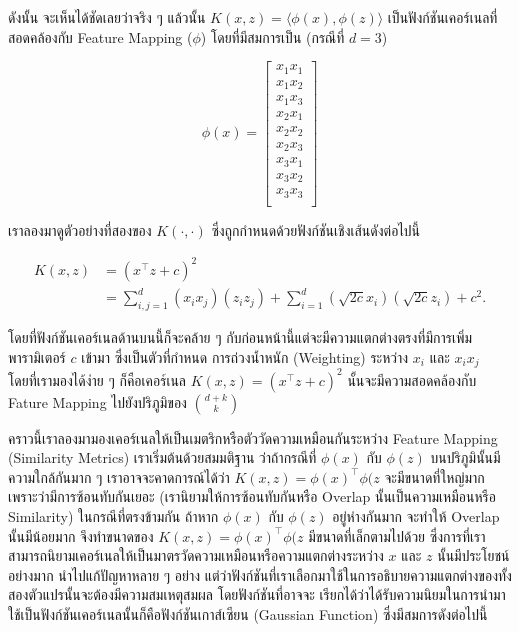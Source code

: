 \noindent ดังนั้น จะเห็นได้ชัดเลยว่าจริง ๆ แล้วนั้น $K(x,z) = \langle\phi(x),\phi(z)\rangle$ เป็นฟังก์ชันเคอร์เนลที่สอดคล้องกับ
Feature Mapping ($\phi$) โดยที่มีสมการเป็น (กรณีที่ $d = 3$)

\begin{equation}
    \phi(x) = \begin{bmatrix}
    x_1 x_1\\
    x_1 x_2\\
    x_1 x_3\\
    x_2 x_1\\
    x_2 x_2\\
    x_2 x_3\\
    x_3 x_1\\
    x_3 x_2\\
    x_3 x_3\\
    \end{bmatrix}
\end{equation}

เราลองมาดูตัวอย่างที่สองของ $K(\cdot,\cdot)$ ซึ่งถูกกำหนดด้วยฟังก์ชันเชิงเส้นดังต่อไปนี้

\begin{align}
    K(x,z) &= (x^{\top} z + c)^2\\
    &= \sum_{i,j=1}^d (x_i x_j)(z_i z_j) + \sum_{i=1}^d \left(\sqrt{2c}x_i\right) \left(\sqrt{2c}z_i\right) + c^2.
\end{align}

\noindent โดยที่ฟังก์ชันเคอร์เนลด้านบนนี้ก็จะคล้าย ๆ กับก่อนหน้านี้แต่จะมีความแตกต่างตรงที่มีการเพิ่มพารามิเตอร์ $c$ เข้ามา ซึ่งเป็นตัวที่กำหนด%
การถ่วงน้ำหนัก (Weighting) ระหว่าง $x_{i}$ และ $x_{i}x_{j}$ โดยที่เรามองได้ง่าย ๆ ก็คือเคอร์เนล $K(x,z) = (x^{\top} z + c)^2$
นั้นจะมีความสอดคล้องกับ Fature Mapping ไปยังปริภูมิของ $\binom{d+k}{k}$

คราวนี้เราลองมามองเคอร์เนลให้เป็นเมตริกหรือตัววัดความเหมือนกันระหว่าง Feature Mapping (Similarity Metrics) เราเริ่มต้นด้วยสมมติฐาน%
ว่าถ้ากรณีที่ $\phi(x)$ กับ $\phi(z)$ บนปริภูมินั้นมีความใกล้กันมาก ๆ เราอาจจะคาดการณ์ได้ว่า $K(x,z) = \phi(x)^{\top} \phi(z$
จะมีขนาดที่ใหญ่มากเพราะว่ามีการซ้อนทับกันเยอะ (เรานิยามให้การซ้อนทับกันหรือ Overlap นั้นเป็นความเหมือนหรือ Similarity) ในกรณีที่ตรงข้ามกัน
ถ้าหาก $\phi(x)$ กับ $\phi(z)$ อยู่ห่างกันมาก จะทำให้ Overlap นั้นมีน้อยมาก จึงทำขนาดของ $K(x,z) = \phi(x)^{\top} \phi(z$ 
มีขนาดที่เล็กตามไปด้วย ซึ่งการที่เราสามารถนิยามเคอร์เนลให้เป็นมาตรวัดความเหมือนหรือความแตกต่างระหว่าง $x$ และ $z$ นั้นมีประโยชน์อย่างมาก%
นำไปแก้ปัญหาหลาย ๆ อย่าง แต่ว่าฟังก์ชันที่เราเลือกมาใช้ในการอธิบายความแตกต่างของทั้งสองตัวแปรนั้นจะต้องมีความสมเหตุสมผล โดยฟังก์ชันที่อาจจะ%
เรียกได้ว่าได้รับความนิยมในการนำมาใช้เป็นฟังก์ชันเคอร์เนลนั้นก็คือฟังก์ชันเกาส์เซียน (Gaussian Function) ซึ่งมีสมการดังต่อไปนี้ 

